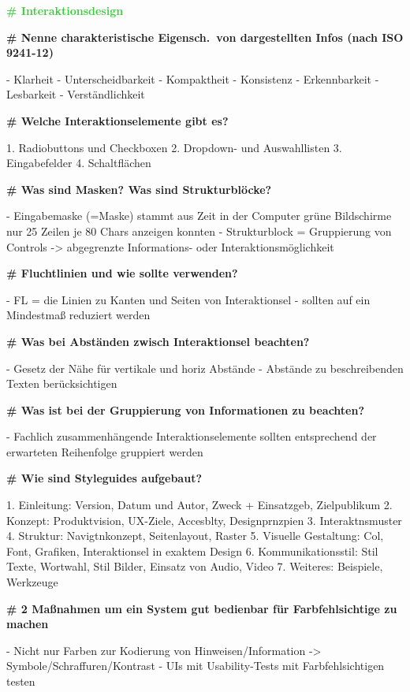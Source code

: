 \documentclass{article}
\begin{document}
\begin{multicols}{3}
\begin{flushleft}
\begin{tiny}
			\textcolor{LimeGreen}{\textbf{\scriptsize{\# Interaktionsdesign}}}

			\textbf{\# Nenne charakteristische Eigensch.\ von dargestellten
				Infos (nach ISO 9241-12)}

			- Klarheit
			- Unterscheidbarkeit
			- Kompaktheit
			- Konsistenz
			- Erkennbarkeit
			- Lesbarkeit
			- Verständlichkeit

			\textbf{\# Welche Interaktionselemente gibt es?}

			1. Radiobuttons und Checkboxen
			2. Dropdown- und Auswahllisten
			3. Eingabefelder
			4. Schaltflächen

			\textbf{\# Was sind Masken? Was sind Strukturblöcke?}

			- Eingabemaske (=Maske) stammt aus Zeit in der
			  Computer grüne Bildschirme nur 25 Zeilen je 80 Chars anzeigen
			  konnten
			- Strukturblock = Gruppierung von Controls -> abgegrenzte
			  Informations- oder Interaktionsmöglichkeit 

			\textbf{\# Fluchtlinien und wie sollte verwenden?}

			- FL = die Linien zu Kanten und Seiten von Interaktionsel
			- sollten auf ein Mindestmaß reduziert werden

			\textbf{\# Was bei Abständen zwisch Interaktionsel beachten?}

			- Gesetz der Nähe für vertikale und horiz Abstände
			- Abstände zu beschreibenden Texten berücksichtigen

			\textbf{\# Was ist bei der Gruppierung von Informationen zu
				beachten?}

			- Fachlich zusammenhängende Interaktionselemente sollten
			  entsprechend der erwarteten Reihenfolge gruppiert werden

			\textbf{\# Wie sind Styleguides aufgebaut?}

			1. Einleitung: Version, Datum und Autor, Zweck + Einsatzgeb,
			   Zielpublikum
			2. Konzept: Produktvision, UX-Ziele, Accesblty,
			   Designprnzpien
			3. Interaktnsmuster
			4. Struktur: Navigtnkonzept, Seitenlayout, Raster
			5. Visuelle Gestaltung: Col, Font, Grafiken, Interaktionsel in
			   exaktem Design
			6. Kommunikationsstil: Stil Texte, Wortwahl, Stil Bilder,
			   Einsatz von Audio, Video
			7. Weiteres: Beispiele, Werkzeuge

			\textbf{\# 2 Maßnahmen um ein System gut bedienbar für
				Farbfehlsichtige zu machen}

			- Nicht nur Farben zur Kodierung von Hinweisen/Information 
			  -> Symbole/Schraffuren/Kontrast
			- UIs mit Usability-Tests mit Farbfehlsichtigen testen


\end{tiny}
\end{flushleft}
\end{multicols}
\end{document}
